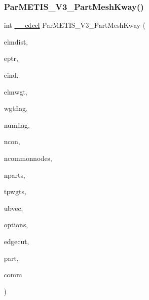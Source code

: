 \subsubsection{\texorpdfstring{Par\+M\+E\+T\+I\+S\+\_\+\+V3\+\_\+\+Part\+Mesh\+Kway()}{ParMETIS\_V3\_PartMeshKway()}}
{\footnotesize\ttfamily int \hyperlink{a00843_a238347d7669f8f1e9c83bfe63a2730c4}{\+\_\+\+\_\+cdecl} Par\+M\+E\+T\+I\+S\+\_\+\+V3\+\_\+\+Part\+Mesh\+Kway (\begin{DoxyParamCaption}\item[{\hyperlink{a00876_aaa5262be3e700770163401acb0150f52}{idx\+\_\+t} $\ast$}]{elmdist,  }\item[{\hyperlink{a00876_aaa5262be3e700770163401acb0150f52}{idx\+\_\+t} $\ast$}]{eptr,  }\item[{\hyperlink{a00876_aaa5262be3e700770163401acb0150f52}{idx\+\_\+t} $\ast$}]{eind,  }\item[{\hyperlink{a00876_aaa5262be3e700770163401acb0150f52}{idx\+\_\+t} $\ast$}]{elmwgt,  }\item[{\hyperlink{a00876_aaa5262be3e700770163401acb0150f52}{idx\+\_\+t} $\ast$}]{wgtflag,  }\item[{\hyperlink{a00876_aaa5262be3e700770163401acb0150f52}{idx\+\_\+t} $\ast$}]{numflag,  }\item[{\hyperlink{a00876_aaa5262be3e700770163401acb0150f52}{idx\+\_\+t} $\ast$}]{ncon,  }\item[{\hyperlink{a00876_aaa5262be3e700770163401acb0150f52}{idx\+\_\+t} $\ast$}]{ncommonnodes,  }\item[{\hyperlink{a00876_aaa5262be3e700770163401acb0150f52}{idx\+\_\+t} $\ast$}]{nparts,  }\item[{\hyperlink{a00876_a1924a4f6907cc3833213aba1f07fcbe9}{real\+\_\+t} $\ast$}]{tpwgts,  }\item[{\hyperlink{a00876_a1924a4f6907cc3833213aba1f07fcbe9}{real\+\_\+t} $\ast$}]{ubvec,  }\item[{\hyperlink{a00876_aaa5262be3e700770163401acb0150f52}{idx\+\_\+t} $\ast$}]{options,  }\item[{\hyperlink{a00876_aaa5262be3e700770163401acb0150f52}{idx\+\_\+t} $\ast$}]{edgecut,  }\item[{\hyperlink{a00876_aaa5262be3e700770163401acb0150f52}{idx\+\_\+t} $\ast$}]{part,  }\item[{M\+P\+I\+\_\+\+Comm $\ast$}]{comm }\end{DoxyParamCaption})}

